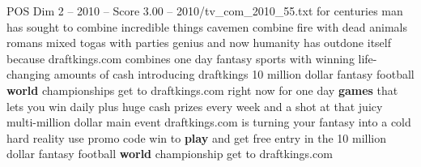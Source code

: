 \begin{textsample}{POS Dim 2 – 2010 – Score 3.00 – 2010/tv\_com\_2010\_55.txt}  \label{ex:f2_pos_041}
for centuries man has sought to combine incredible things cavemen combine fire with dead animals romans mixed togas with parties genius and now humanity has outdone itself because draftkings.com combines one day fantasy sports with winning life-changing amounts of cash introducing draftkings 10 million dollar fantasy football \textbf{world} championships get to draftkings.com right now for one day \textbf{games} that lets you win daily plus huge cash prizes every week and a shot at that juicy multi-million dollar main event draftkings.com is turning your fantasy into a cold hard reality use promo code win to \textbf{play} and get free entry in the 10 million dollar fantasy football \textbf{world} championship get to draftkings.com

\end{textsample}
